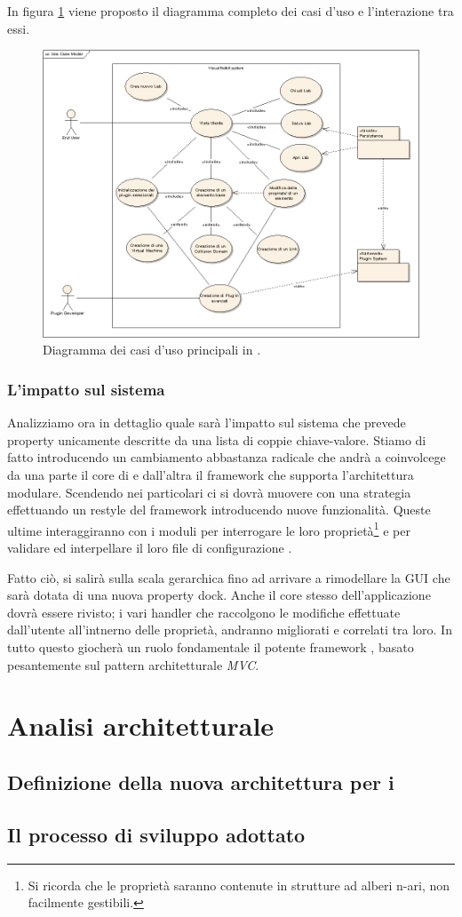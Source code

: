 In figura \ref{figura:uc1} viene proposto il diagramma completo dei casi d'uso e l'interazione tra essi.

\begin{figure}[!htb]
	\centering
	\includegraphics[width=12cm]{images/UseCaseModel.png}
	\caption{Diagramma dei casi d'uso principali in \visualnetkit{}.}
	\label{figura:uc1}
\end{figure}

\subsubsection{L'impatto sul sistema}
Analizziamo ora in dettaglio quale sarà l'impatto sul sistema che prevede property unicamente descritte da una lista di coppie chiave-valore. Stiamo di fatto introducendo un cambiamento abbastanza radicale che andrà a coinvolcege da una parte il core di \visualnetkit{} e dall'altra il framework che supporta l'architettura modulare. Scendendo nei particolari ci si dovrà muovere con una strategia \bu{} effettuando un restyle del \plugin{} framework introducendo nuove funzionalità. Queste ultime interaggiranno con i moduli per interrogare le loro proprietà\footnote{Si ricorda che le proprietà saranno contenute in strutture ad alberi n-ari, non facilmente gestibili.} e per validare ed interpellare il loro file di configurazione \xml{}.

Fatto ciò, si salirà sulla scala gerarchica fino ad arrivare a rimodellare la GUI che sarà dotata di una nuova property dock. Anche il core stesso dell'applicazione dovrà essere rivisto; i vari handler che raccolgono le modifiche effettuate dall'utente all'intnerno delle proprietà, andranno migliorati e correlati tra loro. In tutto questo giocherà un ruolo fondamentale il potente framework \qt{}, basato pesantemente sul pattern architetturale \emph{MVC}\cite{QTDOCMVC}.

\section{Analisi architetturale}

\subsection{Definizione della nuova architettura per i \plugin{}}

\subsection{Il processo di sviluppo adottato}

